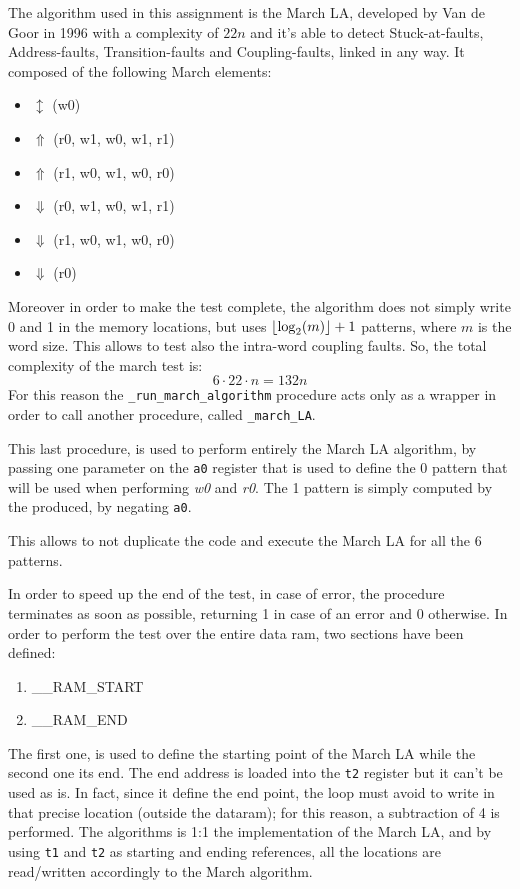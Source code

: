 \documentclass[paper=a4, fontsize=10pt]{scrartcl}	%
\DeclarePairedDelimiter\floor{\lfloor}{\rfloor}
\begin{document}
	The algorithm used in this assignment is the March LA, developed by Van de Goor in 1996 with a complexity of $22n$ and it's able to detect Stuck-at-faults, Address-faults, Transition-faults and Coupling-faults, linked in any way. It composed of the following March elements:
	\begin{itemize}
		\itemsep0sp
		\item $\updownarrow$ (w0)
		\item $\Uparrow$ (r0, w1, w0, w1, r1)
		\item $\Uparrow$ (r1, w0, w1, w0, r0)
		\item $\Downarrow$ (r0, w1, w0, w1, r1)
		\item $\Downarrow$ (r1, w0, w1, w0, r0)
		\item $\Downarrow$ (r0)
	\end{itemize}
	Moreover in order to make the test complete, the algorithm does not simply write 0 and 1 in the memory locations, but uses $ \floor*{\log_2(m)} + 1$ patterns, where $m$ is the word size. This allows to test also the intra-word coupling faults. So, the total complexity of the march test is:
	\[
		6 \cdot 22 \cdot n = 132n
	\]
	For this reason the \texttt{\_run\_march\_algorithm} procedure acts only as a wrapper in order to call another procedure, called \texttt{\_march\_LA}.
	
	This last procedure, is used to perform entirely the March LA algorithm, by passing one parameter on the \texttt{a0} register that is used to define the 0 pattern that will be used when performing \textit{w0} and \textit{r0}. The 1 pattern is simply computed by the produced, by negating \texttt{a0}.
	
	This allows to not duplicate the code and execute the March LA for all the 6 patterns. 
	
	In order to speed up the end of the test, in case of error, the procedure terminates as soon as possible, returning 1 in case of an error and 0 otherwise.\newline\newline
	In order to perform the test over the entire data ram, two sections have been defined:
	\begin{enumerate}
		\itemsep0sp
		\item \_\_RAM\_START
		\item \_\_RAM\_END
	\end{enumerate}
	The first one, is used to define the starting point of the March LA while the second one its end. The end address is loaded into the \texttt{t2} register but it can't be used as is. In fact, since it define the end point, the loop must avoid to write in that precise location (outside the dataram); for this reason, a subtraction of 4 is performed.
	The algorithms is 1:1 the implementation of the March LA, and by using \texttt{t1} and \texttt{t2} as starting and ending references, all the locations are read/written accordingly to the March algorithm.
	
\end{document}
